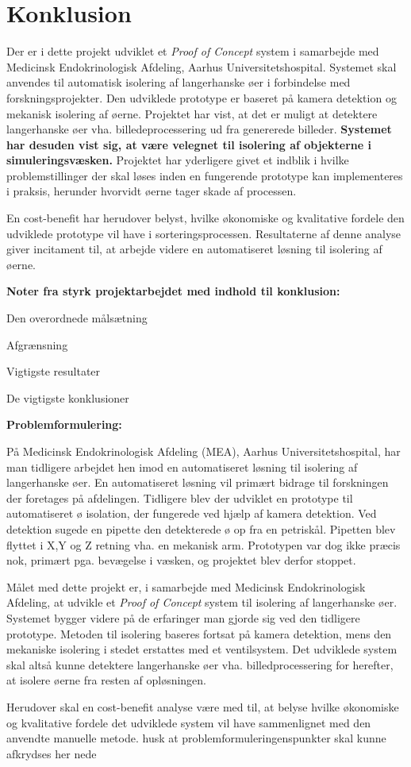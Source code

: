 \chapter{Konklusion}
Der er i dette projekt udviklet et \textit{Proof of Concept} system i samarbejde med Medicinsk Endokrinologisk Afdeling, Aarhus Universitetshospital. Systemet skal anvendes til automatisk isolering af langerhanske øer i forbindelse med forskningsprojekter. Den udviklede prototype er baseret på kamera detektion og mekanisk isolering af øerne. Projektet har vist, at det er muligt at detektere langerhanske øer vha. billedeprocessering ud fra genererede billeder. \textbf{Systemet har desuden vist sig, at være velegnet til isolering af objekterne i simuleringsvæsken.} Projektet har yderligere 
 givet et indblik i hvilke problemstillinger der skal løses inden en fungerende prototype kan implementeres i praksis, herunder hvorvidt øerne tager skade af processen. 

En cost-benefit har herudover belyst, hvilke økonomiske og kvalitative fordele den udviklede prototype vil have i sorteringsprocessen. Resultaterne af denne analyse giver incitament til, at arbejde videre en automatiseret løsning til isolering af øerne. 


\textbf{Noter fra styrk projektarbejdet med indhold til konklusion:}

Den overordnede målsætning

Afgrænsning

Vigtigste resultater

De vigtigste konklusioner

\textbf{Problemformulering:}

På Medicinsk Endokrinologisk Afdeling (MEA), Aarhus Universitetshospital, har man tidligere arbejdet hen imod en automatiseret løsning til isolering af langerhanske øer. En automatiseret løsning vil primært bidrage til forskningen der foretages på afdelingen. Tidligere blev der udviklet en prototype til automatiseret ø isolation, der fungerede ved hjælp af kamera detektion. Ved detektion sugede en pipette den detekterede ø op fra en petriskål. Pipetten blev flyttet i X,Y og Z retning vha. en mekanisk arm. Prototypen var dog ikke præcis nok, primært pga. bevægelse i væsken, og projektet blev derfor stoppet.

Målet med dette projekt er, i samarbejde med Medicinsk Endokrinologisk Afdeling, at udvikle et \textit{Proof of Concept} system til isolering af langerhanske øer. Systemet bygger videre på de erfaringer man gjorde sig ved den tidligere prototype. Metoden til isolering baseres fortsat på kamera detektion, mens den mekaniske isolering i stedet erstattes med et ventilsystem. Det udviklede system skal altså kunne detektere langerhanske øer vha. billedprocessering for herefter, at isolere øerne fra resten af opløsningen. 

Herudover skal en cost-benefit analyse være med til, at belyse hvilke økonomiske og kvalitative fordele det udviklede system vil have sammenlignet med den anvendte manuelle metode.
husk at problemformuleringenspunkter skal kunne afkrydses her nede